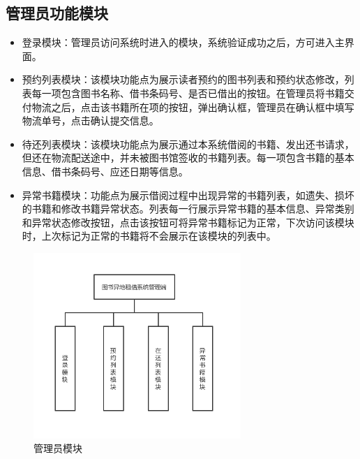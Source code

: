 \subsection{管理员功能模块}
\begin{itemize}
   \item 登录模块：管理员访问系统时进入的模块，系统验证成功之后，方可进入主界面。
   \item  预约列表模块：该模块功能点为展示读者预约的图书列表和预约状态修改，列表每一项包含图书名称、借书条码号、是否已借出的按钮。在管理员将书籍交付物流之后，点击该书籍所在项的按钮，弹出确认框，管理员在确认框中填写物流单号，点击确认提交信息。
   \item 待还列表模块：该模块功能点为展示通过本系统借阅的书籍、发出还书请求，但还在物流配送途中，并未被图书馆签收的书籍列表。每一项包含书籍的基本信息、借书条码号、应还日期等信息。
   \item 异常书籍模块：功能点为展示借阅过程中出现异常的书籍列表，如遗失、损坏的书籍和修改书籍异常状态。列表每一行展示异常书籍的基本信息、异常类别和异常状态修改按钮，点击该按钮可将异常书籍标记为正常，下次访问该模块时，上次标记为正常的书籍将不会展示在该模块的列表中。   
\end{itemize}

\begin{figure}[H]
    \centering
    \includegraphics[width=0.7\textwidth]{./Chapters/images/admin_module.png} %
    \caption{管理员模块} %
    \label{管理员模块} %
\end{figure}
